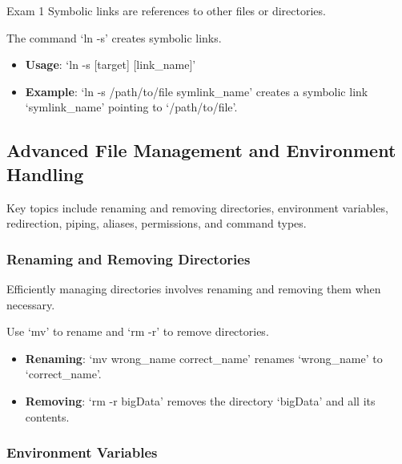 \begin{examnotes}{Exam 1}
    Symbolic links are references to other files or directories.
    
    \begin{highlight}
        The command `ln -s' creates symbolic links.
        
        \begin{itemize}
            \item \textbf{Usage}: `ln -s [target] [link\_name]'
            \item \textbf{Example}: `ln -s /path/to/file symlink\_name' creates a symbolic link `symlink\_name' pointing to `/path/to/file'.
        \end{itemize}
    \end{highlight}
    
    \subsection*{Advanced File Management and Environment Handling}
    
    Key topics include renaming and removing directories, environment variables, redirection, piping, aliases, permissions, and command types.
    
    \subsubsection*{Renaming and Removing Directories}
    
    Efficiently managing directories involves renaming and removing them when necessary.
    
    \begin{highlight}
        Use `mv' to rename and `rm -r' to remove directories.
        
        \begin{itemize}
            \item \textbf{Renaming}: `mv wrong\_name correct\_name' renames `wrong\_name' to `correct\_name'.
            \item \textbf{Removing}: `rm -r bigData' removes the directory `bigData' and all its contents.
        \end{itemize}
    \end{highlight}
    
    \subsubsection*{Environment Variables}
    

\end{examnotes}
